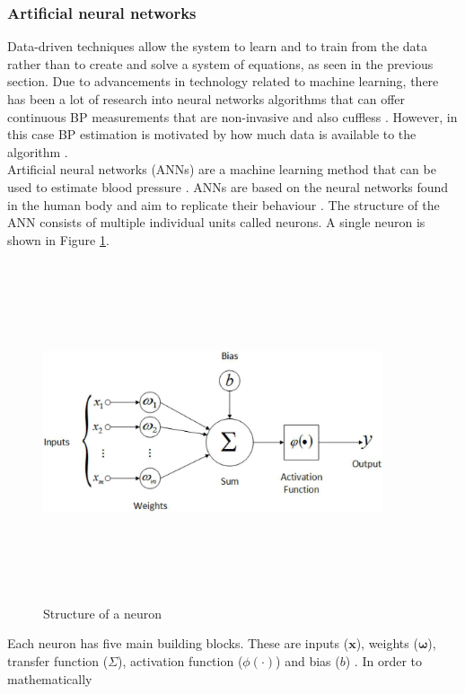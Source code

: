  \subsubsection{Artificial neural networks}
 Data-driven techniques allow the system to learn and to train from the data rather than 
 to create and solve a system of equations, as seen in the previous section. Due to advancements in technology related to machine learning, there has 
 been a lot of research into neural networks algorithms that can offer 
 continuous BP measurements that are non-invasive and also 
 cuffless \cite{Pradenas2020}. However, in this case BP 
 estimation is motivated by how much data is available to the 
 algorithm \cite{ElHajj2020}. \\ \newline \noindent Artificial neural 
 networks (ANNs) are a machine learning method that can be used to estimate 
 blood pressure \cite{Pradenas2020}. ANNs are based on the neural networks 
 found in the human body and aim to replicate their behaviour \cite{Yang2020}. The 
 structure of the ANN consists of multiple individual units called neurons. A single neuron is shown in Figure 
 \ref{neuron}.  \begin{figure}[H]
    \centering
    \includegraphics[width=10cm,height=10cm,keepaspectratio]{Background/neuron.jpeg}
    \caption{Structure of a neuron \cite{Almusawi2020}}
    \label{neuron}
\end{figure}\noindent Each 
 neuron has five main building blocks. These are inputs ($\bm{x}$), weights ($\bm{\omega}$), transfer 
 function ($\Sigma$), activation function ($\phi(\cdot)$) and bias ($b$) \cite{deeplearning}. In order to mathematically 
